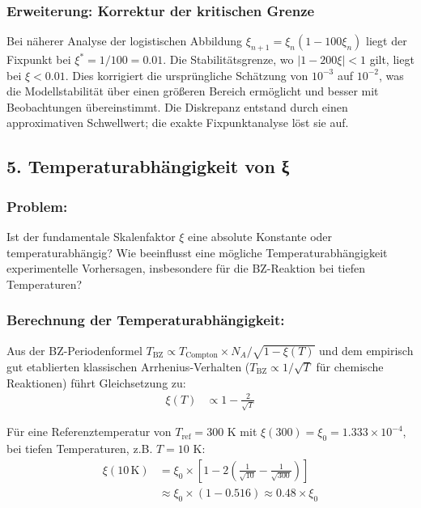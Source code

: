 \subsubsection*{Erweiterung: Korrektur der kritischen Grenze}
Bei näherer Analyse der logistischen Abbildung $\xi_{n+1} = \xi_n (1 - 100 \xi_n)$ liegt der Fixpunkt bei $\xi^* = 1/100 = 0.01$. Die Stabilitätsgrenze, wo $| 1 - 200 \xi| < 1 $ gilt, liegt bei $\xi < 0.01$. Dies korrigiert die ursprüngliche Schätzung von $10^{-3}$ auf $10^{-2}$, was die Modellstabilität über einen größeren Bereich ermöglicht und besser mit Beobachtungen übereinstimmt. Die Diskrepanz entstand durch einen approximativen Schwellwert; die exakte Fixpunktanalyse löst sie auf.

\subsection*{5. Temperaturabhängigkeit von ξ}

\subsubsection*{Problem:}
Ist der fundamentale Skalenfaktor $\xi$ eine absolute Konstante oder temperaturabhängig? Wie beeinflusst eine mögliche Temperaturabhängigkeit experimentelle Vorhersagen, insbesondere für die BZ-Reaktion bei tiefen Temperaturen?

\subsubsection*{Berechnung der Temperaturabhängigkeit:}

Aus der BZ-Periodenformel $T_{\text{BZ}} \propto T_{\text{Compton}} \times N_A / \sqrt{1 - \xi(T)}$ und dem empirisch gut etablierten klassischen Arrhenius-Verhalten ($T_{\text{BZ}} \propto 1/\sqrt{T}$ für chemische Reaktionen) führt Gleichsetzung zu:
\begin{align*}
	\xi(T) &\propto 1 - \frac{2}{\sqrt{T}}
\end{align*}

Für eine Referenztemperatur von $T_{\text{ref}} = 300$ K mit $\xi(300) = \xi_0 = 1.333 \times 10^{-4}$, bei tiefen Temperaturen, z.B. $T = 10$ K:
\begin{align*}
	\xi(10 \, \text{K}) &= \xi_0 \times \left[1 - 2\left(\frac{1}{\sqrt{10}} - \frac{1}{\sqrt{300}}\right)\right] \\
	&\approx \xi_0 \times (1 - 0.516) \approx 0.48 \times \xi_0
\end{align*}

